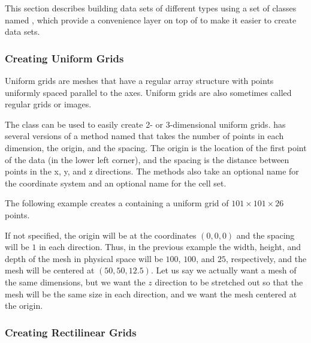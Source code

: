 This section describes building data sets of different types using a set of
classes named , which provide a convenience layer
on top of  to make it easier to create data sets.

\subsubsection{Creating Uniform Grids}


Uniform grids are meshes that have a regular array structure with points
uniformly spaced parallel to the axes. Uniform grids are also sometimes
called regular grids or images.

The  class can be used to easily create 2-
or 3-dimensional uniform grids.  has
several versions of a method named  that takes the number
of points in each dimension, the origin, and the spacing. The origin is the
location of the first point of the data (in the lower left corner), and the
spacing is the distance between points in the x, y, and z directions. The
 methods also take an optional name for the coordinate
system and an optional name for the cell set.

The following example creates a  containing a uniform
grid of $101 \times 101 \times 26$ points.


If not specified, the origin will be at the coordinates $(0,0,0)$ and the
spacing will be $1$ in each direction. Thus, in the previous example the
width, height, and depth of the mesh in physical space will be $100$,
$100$, and $25$, respectively, and the mesh will be centered at $(50, 50,
12.5)$. Let us say we actually want a mesh of the same dimensions, but we
want the $z$ direction to be stretched out so that the mesh will be the
same size in each direction, and we want the mesh centered at the origin.


\subsubsection{Creating Rectilinear Grids}

